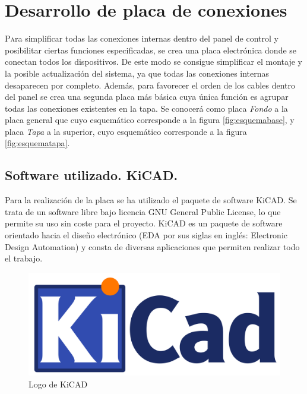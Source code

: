 \chapter{Desarrollo de placa de conexiones}\label{chp-03}

\lettrine[lraise=-0.1, lines=2, loversize=0.2]{P}ara simplificar todas las conexiones internas dentro del panel de control y posibilitar ciertas funciones especificadas, se crea una placa electrónica donde se conectan todos los dispositivos. De este modo se consigue simplificar el montaje y la posible actualización del sistema, ya que todas las conexiones internas desaparecen por completo. Además, para favorecer el orden de los cables dentro del panel se crea una segunda placa más básica cuya única función es agrupar todas las conexiones existentes en la tapa. Se conocerá como placa \textit{Fondo} a la placa general que cuyo esquemático corresponde a la figura \ref{fig:esquemabase}, y placa \textit{Tapa} a la superior, cuyo esquemático corresponde a la figura \ref{fig:esquematapa}.

\section{Software utilizado. KiCAD.}

Para la realización de la placa se ha utilizado el paquete de software KiCAD. Se trata de un software 
libre bajo licencia GNU General Public License, lo que permite su uso sin coste para el proyecto. KiCAD
es un paquete de software orientado hacia el diseño electrónico (EDA por sus siglas en inglés: Electronic
Design Automation) y consta de diversas aplicaciones que permiten realizar todo el trabajo.



\begin{figure}[hbtp]
    \centering
    \includegraphics[width=\textwidth/3]{03-placa/01-KiCad-Logo.png}
    \caption{Logo de KiCAD}
    \label{fig:figura31logo}
    \end{figure}

